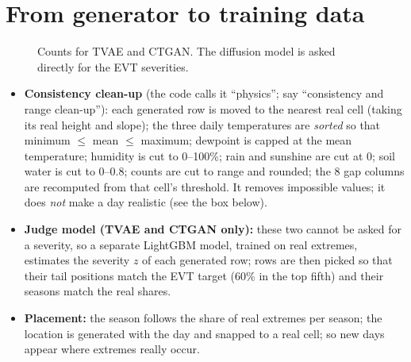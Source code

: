 \section{From generator to training data}
\begin{figure}[H]
\centering
{}
\caption{Counts for TVAE and CTGAN. The diffusion model is asked directly for the EVT severities.}
\end{figure}
\begin{itemize}
  \item \textbf{Consistency clean-up} (the code calls it ``physics''; say ``consistency and range clean-up''):
        each generated row is moved to the nearest real cell (taking its real height and slope); the three daily
        temperatures are \emph{sorted} so that minimum $\le$ mean $\le$ maximum; dewpoint is capped at the mean
        temperature; humidity is cut to 0--100\%; rain and sunshine are cut at 0; soil water is cut to 0--0.8; counts
        are cut to range and rounded; the 8 gap columns are recomputed from that cell's threshold. It removes
        impossible values; it does \emph{not} make a day realistic (see the box below).
  \item \textbf{Judge model (TVAE and CTGAN only):} these two cannot be asked for a severity, so a separate LightGBM
        model, trained on real extremes, estimates the severity $z$ of each generated row; rows are then picked so that
        their tail positions match the EVT target (60\% in the top fifth) and their seasons match the real shares.
  \item \textbf{Placement:} the season follows the share of real extremes per season; the location is generated with
        the day and snapped to a real cell; so new days appear where extremes really occur.
\end{itemize}


